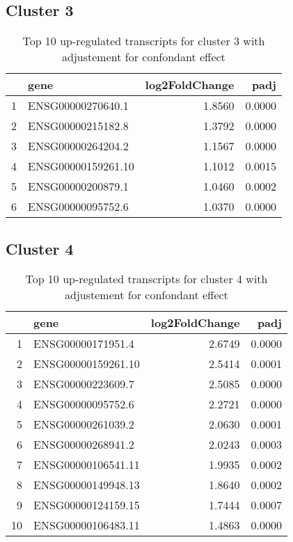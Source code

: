 \documentclass{article}
\begin{document}
\subsection{Cluster 3 }
\begin{table}[H]
\centering
\begin{tabular}{rlrr}
  \hline
 & gene & log2FoldChange & padj \\ 
  \hline
1 & ENSG00000270640.1 & 1.8560 & 0.0000 \\ 
  2 & ENSG00000215182.8 & 1.3792 & 0.0000 \\ 
  3 & ENSG00000264204.2 & 1.1567 & 0.0000 \\ 
  4 & ENSG00000159261.10 & 1.1012 & 0.0015 \\ 
  5 & ENSG00000200879.1 & 1.0460 & 0.0002 \\ 
  6 & ENSG00000095752.6 & 1.0370 & 0.0000 \\ 
   \hline
\end{tabular}
\caption{Top 10 up-regulated transcripts for cluster 3 with adjustement for confondant effect} 
\label{tab:q3_1_conf_3}
\end{table}
\subsection{Cluster 4 }
\begin{table}[H]
\centering
\begin{tabular}{rlrr}
  \hline
 & gene & log2FoldChange & padj \\ 
  \hline
1 & ENSG00000171951.4 & 2.6749 & 0.0000 \\ 
  2 & ENSG00000159261.10 & 2.5414 & 0.0001 \\ 
  3 & ENSG00000223609.7 & 2.5085 & 0.0000 \\ 
  4 & ENSG00000095752.6 & 2.2721 & 0.0000 \\ 
  5 & ENSG00000261039.2 & 2.0630 & 0.0001 \\ 
  6 & ENSG00000268941.2 & 2.0243 & 0.0003 \\ 
  7 & ENSG00000106541.11 & 1.9935 & 0.0002 \\ 
  8 & ENSG00000149948.13 & 1.8640 & 0.0002 \\ 
  9 & ENSG00000124159.15 & 1.7444 & 0.0007 \\ 
  10 & ENSG00000106483.11 & 1.4863 & 0.0000 \\ 
   \hline
\end{tabular}
\caption{Top 10 up-regulated transcripts for cluster 4 with adjustement for confondant effect} 
\label{tab:q3_1_conf_4}
\end{table}
\end{document}
